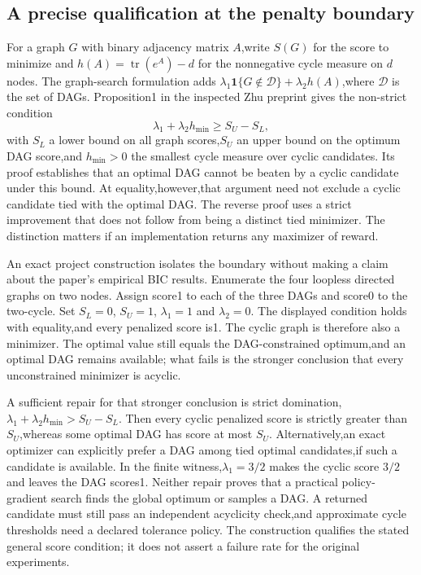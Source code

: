 \subsection{A precise qualification at the penalty boundary}
For a graph $G$ with binary adjacency matrix $A$,write $S(G)$ for the score to minimize and
$h(A)=\operatorname{tr}(e^A)-d$ for the nonnegative cycle measure on $d$ nodes. The graph-search
formulation adds $\lambda_1\mathbf{1}\{G\notin\mathcal D\}+\lambda_2h(A)$,where $\mathcal D$
is the set of DAGs. Proposition1 in the inspected Zhu preprint gives the non-strict condition
\[
 \lambda_1+\lambda_2h_{\min}\geq S_U-S_L,
\]
with $S_L$ a lower bound on all graph scores,$S_U$ an upper bound on the optimum DAG score,and
$h_{\min}>0$ the smallest cycle measure over cyclic candidates. Its proof establishes that an
optimal DAG cannot be beaten by a cyclic candidate under this bound. At equality,however,that
argument need not exclude a cyclic candidate tied with the optimal DAG. The reverse proof uses
a strict improvement that does not follow from being a distinct tied minimizer. The distinction
matters if an implementation returns any maximizer of reward.\citep{exec28_rl_zhu}

An exact project construction isolates the boundary without making a claim about the paper's
empirical BIC results. Enumerate the four loopless directed graphs on two nodes. Assign score1
to each of the three DAGs and score0 to the two-cycle. Set $S_L=0$, $S_U=1$,
$\lambda_1=1$ and $\lambda_2=0$. The displayed condition holds with equality,and every penalized
score is1. The cyclic graph is therefore also a minimizer. The optimal value still equals the
DAG-constrained optimum,and an optimal DAG remains available; what fails is the stronger
conclusion that every unconstrained minimizer is acyclic.\citep{exec28_rl_reference}

A sufficient repair for that stronger conclusion is strict domination,
$\lambda_1+\lambda_2h_{\min}>S_U-S_L$. Then every cyclic penalized score is strictly greater
than $S_U$,whereas some optimal DAG has score at most $S_U$. Alternatively,an exact optimizer
can explicitly prefer a DAG among tied optimal candidates,if such a candidate is available.
In the finite witness,$\lambda_1=3/2$ makes the cyclic score $3/2$ and leaves the DAG scores1.
Neither repair proves that a practical policy-gradient search finds the global optimum or samples
a DAG. A returned candidate must still pass an independent acyclicity check,and approximate
cycle thresholds need a declared tolerance policy. The construction qualifies the stated general
score condition; it does not assert a failure rate for the original experiments.
\citep{exec28_rl_reference}

